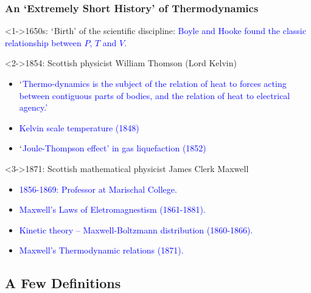 \documentclass[10pt,compress]{beamer}
\begin{document}
\begin{frame}
 \frametitle{An `Extremely Short History' of Thermodynamics}

   {\begin{block}<1->{1650s: $\lq$Birth' of the scientific discipline:}
   \textcolor{blue}{Boyle and Hooke found the classic relationship between $P$, $T$ and $V$.}
   \end{block}}


   {\begin{block}<2->{1854: Scottish physicist William Thomson (Lord Kelvin)}
     \begin{itemize}
       \item \textcolor{blue}{$\lq$Thermo-dynamics is the subject of the relation of heat to forces acting between contiguous parts of bodies, and the relation of heat to electrical agency.'}
       \item \textcolor{blue}{Kelvin scale temperature (1848)}
       \item \textcolor{blue}{$\lq$Joule-Thompson effect' in gas liquefaction (1852)}
     \end{itemize}
   \end{block}}

   {\begin{block}<3->{1871: Scottish mathematical physicist James Clerk Maxwell}
     \begin{itemize}
       \item \textcolor{blue}{1856-1869: Professor at Marischal College.}
       \item \textcolor{blue}{Maxwell's Laws of Eletromagnestism (1861-1881).}
       \item \textcolor{blue}{Kinetic theory -- Maxwell-Boltzmann distribution (1860-1866).}
       \item \textcolor{blue}{Maxwell's Thermodynamic relations (1871).}
     \end{itemize}
   \end{block}}

\end{frame}

\subsection{A Few Definitions} 
\end{document}
